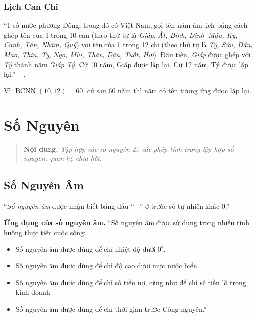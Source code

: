 \documentclass[oneside]{book}
\numberwithin{equation}{section}
\begin{document}
\subsection{Lịch Can Chi}
``1 số nước phương Đông, trong đó có Việt Nam, gọi tên năm âm lịch bằng cách ghép tên của 1 trong 10 can (theo thứ tự là \textit{Giáp, Ất, Bính, Đinh, Mậu, Kỷ, Canh, Tân, Nhâm, Quý}) với tên của 1 trong 12 chi (theo thứ tự là \textit{Tý, Sửu, Dần, Mão, Thìn, Tỵ, Ngọ, Mùi, Thân, Dậu, Tuất, Hợi}). Đầu tiên, \textit{Giáp} được ghép với \textit{Tý} thành năm \textit{Giáp Tý}. Cứ 10 năm, Giáp được lặp lại. Cứ 12 năm, Tý được lặp lại.'' -- \cite[p. 58]{Thai_Anh_Dat_Ha_Loan_Nam_Quang_Toan_6_tap_1}.

Vì $\operatorname{BCNN}(10,12) = 60$, cứ sau 60 năm thì năm có tên tương ứng được lặp lại.


\chapter{Số Nguyên}

\begin{quotation}
	\textbf{Nội dung.} \textit{Tập hợp các số nguyên $\mathbb{Z}$; các phép tính trong tập hợp số nguyên; quan hệ chia hết}.
\end{quotation}

\section{Số Nguyên Âm}
``\emph{Số nguyên âm} được nhận biết bằng dấu ``$-$'' ở trước số tự nhiên khác 0.'' -- \cite[p. 61]{Thai_Anh_Dat_Ha_Loan_Nam_Quang_Toan_6_tap_1}

\noindent\textbf{Ứng dụng của số nguyên âm.} ``Số nguyên âm được sử dụng trong nhiều tình huống thực tiễn cuộc sống:
\begin{itemize}
	\item Số nguyên âm được dùng để chỉ nhiệt độ dưới $0^\circ$.
	\item Số nguyên âm được dùng để chỉ độ cao dưới mực nước biển.
	\item Số nguyên âm được dùng để chỉ số tiền nợ, cũng như để chỉ số tiền lỗ trong kinh doanh.
	\item Số nguyên âm được dùng để chỉ thời gian trước Công nguyên.'' -- \cite[p. 62]{Thai_Anh_Dat_Ha_Loan_Nam_Quang_Toan_6_tap_1}
\end{itemize}
\end{document}
